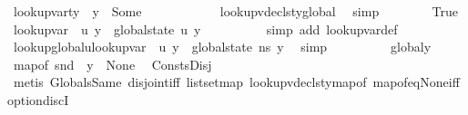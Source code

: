 \begin{isabellebody}
\ {\isacartoucheopen}lookup{\isacharunderscore}{\kern0pt}var{\isacharunderscore}{\kern0pt}ty\ {\isasymLambda}{\isacharprime}{\kern0pt}\ y\ {\isacharequal}{\kern0pt}\ Some\ {\isasymtau}{\isacartoucheclose}\ \isanewline
\ \ \ \ \ \ \ \ \isamarkupfalse%
\ lookup{\isacharunderscore}{\kern0pt}vdecls{\isacharunderscore}{\kern0pt}ty{\isacharunderscore}{\kern0pt}global{\isacharunderscore}{\kern0pt}{}\ \isamarkupfalse%
\ simp\isanewline
\ \ \ \ \ \ \isamarkupfalse%
\ True\ \isamarkupfalse%
\ {\isachardoublequoteopen}lookup{\isacharunderscore}{\kern0pt}var\ {\isasymLambda}{\isacharprime}{\kern0pt}\ {\isacharquery}{\kern0pt}u\ y\ {\isacharequal}{\kern0pt}\ global{\isacharunderscore}{\kern0pt}state\ {\isacharquery}{\kern0pt}u\ y{\isachardoublequoteclose}\isanewline
\ \ \ \ \ \ \ \ \isamarkupfalse%
\ {\isacharparenleft}{\kern0pt}simp\ add{\isacharcolon}{\kern0pt}\ lookup{\isacharunderscore}{\kern0pt}var{\isacharunderscore}{\kern0pt}def{\isacharparenright}{\kern0pt}\isanewline
\ \ \ \ \ \ \isamarkupfalse%
\ lookup{\isacharunderscore}{\kern0pt}global{\isacharunderscore}{\kern0pt}u{\isacharcolon}{\kern0pt}{\isachardoublequoteopen}lookup{\isacharunderscore}{\kern0pt}var\ {\isasymLambda}{\isacharprime}{\kern0pt}\ {\isacharquery}{\kern0pt}u\ y\ {\isacharequal}{\kern0pt}\ global{\isacharunderscore}{\kern0pt}state\ ns\ y{\isachardoublequoteclose}\ \isamarkupfalse%
\ simp\isanewline
\ \ \ \ \ \ \isamarkupfalse%
\ \isamarkupfalse%
\ global{\isacharunderscore}{\kern0pt}y\ \isamarkupfalse%
\ {\isachardoublequoteopen}map{\isacharunderscore}{\kern0pt}of\ {\isacharparenleft}{\kern0pt}snd\ {\isasymLambda}{\isacharparenright}{\kern0pt}\ y\ {\isacharequal}{\kern0pt}\ None{\isachardoublequoteclose}\ \isamarkupfalse%
\ ConstsDisj\ \isanewline
\ \ \ \ \ \ \ \ \isamarkupfalse%
\ {\isacharparenleft}{\kern0pt}metis\ GlobalsSame\ disjoint{\isacharunderscore}{\kern0pt}iff\ list{\isachardot}{\kern0pt}set{\isacharunderscore}{\kern0pt}map\ lookup{\isacharunderscore}{\kern0pt}vdecls{\isacharunderscore}{\kern0pt}ty{\isacharunderscore}{\kern0pt}map{\isacharunderscore}{\kern0pt}of\ map{\isacharunderscore}{\kern0pt}of{\isacharunderscore}{\kern0pt}eq{\isacharunderscore}{\kern0pt}None{\isacharunderscore}{\kern0pt}iff\ option{\isachardot}{\kern0pt}discI{\isacharparenright}{\kern0pt}\ \ \ \ \ \ \ \ \isanewline
\ \ \ \ \ \ \isamarkupfalse%

\end{isabellebody}
